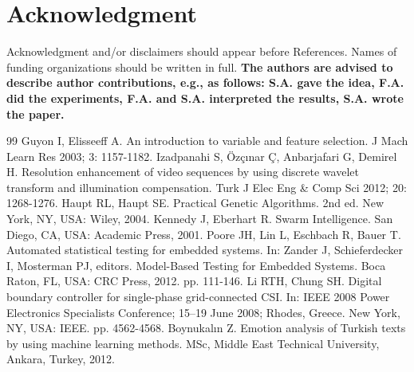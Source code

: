\documentclass{elektr}
\begin{document}
\section*{Acknowledgment}
Acknowledgment and/or disclaimers should appear before References. Names of funding organizations should be written in full. \textbf{The authors are advised to describe author contributions, e.g., as follows: S.A. gave the idea, F.A. did the experiments, F.A. and S.A. interpreted the results, S.A. wrote the paper.} 


\begin{thebibliography}{99}
 Guyon I, Elisseeff A. An introduction to variable and feature selection. J Mach Learn Res 2003; 3: 1157-1182.
 Izadpanahi S, \"{O}z\c{c}\i nar \c{C}, Anbarjafari G, Demirel H. Resolution enhancement of video sequences by using discrete wavelet transform and illumination compensation. Turk J Elec Eng {\&} Comp Sci 2012; 20: 1268-1276.
 Haupt RL, Haupt SE. Practical Genetic Algorithms. 2nd ed. New York, NY, USA: Wiley, 2004.
 Kennedy J, Eberhart R. Swarm Intelligence. San Diego, CA, USA: Academic Press, 2001. 
 Poore JH, Lin L, Eschbach R, Bauer T. Automated statistical testing for embedded systems. In: Zander J, Schieferdecker I, Mosterman PJ, editors. Model-Based Testing for Embedded Systems. Boca Raton, FL, USA: CRC Press, 2012. pp. 111-146.
 Li RTH, Chung SH. Digital boundary controller for single-phase grid-connected CSI. In: IEEE 2008 Power Electronics Specialists Conference; 15--19 June 2008; Rhodes, Greece. New York, NY, USA: IEEE. pp. 4562-4568.
 Boynukal\i n Z. Emotion analysis of Turkish texts by using machine learning methods. MSc, Middle East Technical University, Ankara, Turkey, 2012.
\end{thebibliography}
\end{document}
